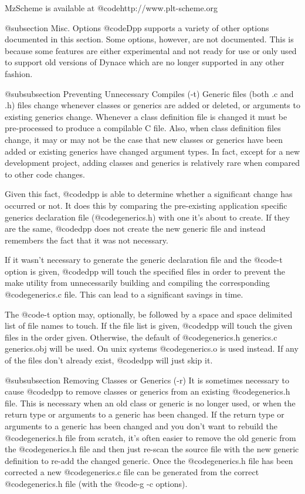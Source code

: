 MzScheme is available at
@code{http://www.plt-scheme.org}

@subsection Misc. Options
@code{Dpp} supports a variety of other options documented in this
section.  Some options, however, are not documented.  This is because
some features are either experimental and not ready for use or only used
to support old versions of Dynace which are no longer supported in any
other fashion.

@subsubsection Preventing Unnecessary Compiles (-t)
Generic files (both .c and .h) files change whenever classes or generics
are added or deleted, or arguments to existing generics change.
Whenever a class definition file is changed it must be pre-processed
to produce a compilable C file.  Also, when class definition files
change, it may or may not be the case that new classes or generics
have been added or existing generics have changed argument types.
In fact, except for a new development project, adding classes and
generics is relatively rare when compared to other code changes.

Given this fact, @code{dpp} is able to determine whether a significant
change has occurred or not.  It does this by comparing the pre-existing
application specific generics declaration file (@code{generics.h})
with one it's about to create.  If they are the same, @code{dpp}
does not create the new generic file and instead remembers the fact
that it was not necessary.

If it wasn't necessary to generate the generic declaration file
and the @code{-t} option is given, @code{dpp} will touch the specified
files in order to prevent the make utility from unnecessarily building
and compiling the corresponding @code{generics.c} file.  This
can lead to a significant savings in time.


The @code{-t} option may, optionally, be followed by a space and space
delimited list of file names to touch.  If the file list is given,
@code{dpp} will touch the given files in the order given.  Otherwise, the
default of @code{generics.h generics.c generics.obj} will be used.
On unix systems @code{generics.o} is used instead.  If any of the
files don't already exist, @code{dpp} will just skip it.

@subsubsection Removing Classes or Generics (-r)
It is sometimes necessary to cause @code{dpp} to remove classes or
generics from an existing @code{generics.h} file.  This is necessary
when an old class or generic is no longer used, or when the return type
or arguments to a generic has been changed.  If the return type or
arguments to a generic has been changed and you don't want to rebuild
the @code{generics.h} file from scratch, it's often easier to remove the
old generic from the @code{generics.h} file and then just re-scan the
source file with the new generic definition to re-add the changed
generic.  Once the @code{generics.h} file has been corrected a new
@code{generics.c} file can be generated from the correct
@code{generics.h} file (with the @code{-g -c} options).

